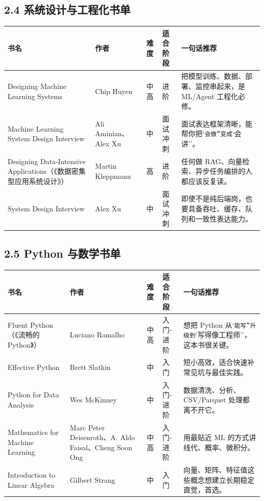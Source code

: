 \subsection{2.4 系统设计与工程化书单}

\begingroup
\scriptsize
\setlength{\tabcolsep}{3pt}
\begin{longtable}{|p{}|p{}|p{}|p{}|p{}|}
\hline
书名 & 作者 & 难度 & 适合阶段 & 一句话推荐 \\ \hline
Designing Machine Learning Systems & Chip Huyen & 中高 & 进阶 & 把模型训练、数据、部署、监控串起来，是 ML/Agent 工程化必修。 \\ \hline
Machine Learning System Design Interview & Ali Aminian、Alex Xu & 中 & 面试冲刺 & 面试表达框架清晰，能帮你把`\texttt{会做''变成}`会讲''。 \\ \hline
Designing Data-Intensive Applications（《数据密集型应用系统设计》） & Martin Kleppmann & 高 & 进阶 & 任何做 RAG、向量检索、异步任务编排的人都应该反复读。 \\ \hline
System Design Interview & Alex Xu & 中 & 面试冲刺 & 即使不是纯后端岗，也要具备吞吐、缓存、队列和一致性表达能力。 \\ \hline
\end{longtable}
\endgroup

\subsection{2.5 Python 与数学书单}

\begingroup
\scriptsize
\setlength{\tabcolsep}{3pt}
\begin{longtable}{|p{}|p{}|p{}|p{}|p{}|}
\hline
书名 & 作者 & 难度 & 适合阶段 & 一句话推荐 \\ \hline
Fluent Python（《流畅的 Python》） & Luciano Ramalho & 中高 & 入门-进阶 & 想把 Python 从`\texttt{能写''升级到}`写得像工程师''，这本书很关键。 \\ \hline
Effective Python & Brett Slatkin & 中 & 入门 & 短小高效，适合快速补常见坑与最佳实践。 \\ \hline
Python for Data Analysis & Wes McKinney & 中 & 入门-进阶 & 数据清洗、分析、CSV/Parquet 处理都离不开它。 \\ \hline
Mathematics for Machine Learning & Marc Peter Deisenroth、A. Aldo Faisal、Cheng Soon Ong & 中高 & 入门-进阶 & 用最贴近 ML 的方式讲线代、概率、微积分。 \\ \hline
Introduction to Linear Algebra & Gilbert Strang & 中 & 入门 & 向量、矩阵、特征值这些概念想建立长期稳定直觉，首选。 \\ \hline
\end{longtable}
\endgroup

